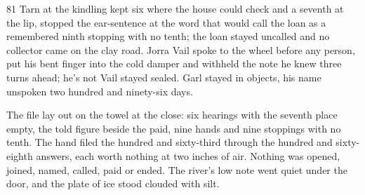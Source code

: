 \begin{CRchronicle}{81}
Tarn at the kindling kept six where the house could check and a seventh at the lip, stopped the ear-sentence at the word that would call the loan as a remembered ninth stopping with no tenth; the loan stayed uncalled and no collector came on the clay road. Jorra Vail spoke to the wheel before any person, put his bent finger into the cold damper and withheld the note he knew three turns ahead; he’s not Vail stayed sealed. Garl stayed in objects, his name unspoken two hundred and ninety-six days.

The file lay out on the towel at the close: six hearings with the seventh place empty, the told figure beside the paid, nine hands and nine stoppings with no tenth. The hand filed the hundred and sixty-third through the hundred and sixty-eighth answers, each worth nothing at two inches of air. Nothing was opened, joined, named, called, paid or ended. The river’s low note went quiet under the door, and the plate of ice stood clouded with silt.
\end{CRchronicle}
